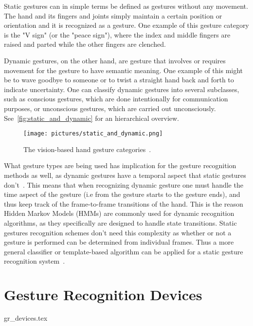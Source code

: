 Static gestures can in simple terms be defined as gestures
without any movement. The hand and its fingers and joints simply maintain a certain position or orientation and it is recognized as a gesture. One example 
of this gesture category is the "V sign" (or the "peace sign"), where the index and middle fingers are raised and parted while the other fingers are clenched.

Dynamic gestures, on the other hand, are gesture that involves or requires movement for the gesture to have semantic meaning. One example of this
might be to wave goodbye to someone or to twist a straight hand back and forth to indicate uncertainty. One can classify dynamic gestures into several 
subclasses, such as conscious gestures, which are done intentionally for communication purposes, or unconscious gestures, which are carried out unconsciously.
See~\vref{fig:static_and_dynamic} for an hierarchical overview.

\begin{figure}%
	\texttt{[image: pictures/static\_and\_dynamic.png]}
	\caption[The vision-based hand gesture categories]{The vision-based hand gesture categories~\citep{Kanniche2009}.}
	\label{fig:static_and_dynamic}
\end{figure} 


What gesture types are being used has implication for the gesture recognition methods as well, as dynamic gestures have a temporal aspect that 
static gestures don't~\citep{Rautaray2015}. This means that when recognizing dynamic gesture one must handle the time aspect of the gesture (i.e from the gesture starts
to the gesture ends), and thus keep track of the frame-to-frame transitions of the hand. This is the reason Hidden Markov Models (HMMs) are commonly used for
dynamic recognition algorithms, as they specifically are designed to handle state transitions. Static gestures recognition schemes don't need this complexity as 
whether or not a gesture is performed can be determined from individual frames. Thus a more general classifier or template-based algorithm can be applied for a 
static gesture recognition system~\citep{Rautaray2015}.

\section{Gesture Recognition Devices}
\label{sec:gr_devices}
{gr_devices.tex}


